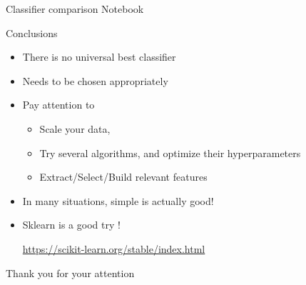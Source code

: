 \begin{frame}{Classifier comparison}
  \alert{Notebook}
\end{frame}
\begin{frame}{Conclusions}
  \begin{itemize}
  \item There is no universal best classifier
  \item Needs to be chosen appropriately
  \item Pay attention to
    \begin{itemize}
    \item Scale your data,
    \item Try several algorithms, and optimize their hyperparameters
    \item Extract/Select/Build relevant features
    \end{itemize}
  \item In many situations, simple is actually good!
  \item Sklearn is a good try !
    \centerline{\url{https://scikit-learn.org/stable/index.html}}
  \end{itemize}
\end{frame}


\begin{frame}[label=conclusion,standout,noframenumbering]{}
\begin{center}
Thank you for your attention
\end{center}
\end{frame}
\begin{frame}[noframenumbering,label={sec:orgc756501}]{}
\begin{center}
\small
\doclicenseLongText

\doclicenseImage
\end{center}
\end{frame}
